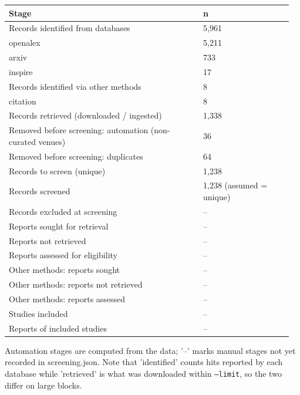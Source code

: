 \documentclass[10pt,a4paper]{article}
\begin{document}
{\scriptsize\begin{longtable}{p{0.655\linewidth}p{0.300\linewidth}}
\hline
\textbf{Stage} & \textbf{n} \\ \hline
\endhead
Records identified from databases & 5,961 \\
  openalex & 5,211 \\
  arxiv & 733 \\
  inspire & 17 \\
Records identified via other methods & 8 \\
  citation & 8 \\
Records retrieved (downloaded / ingested) & 1,338 \\
Removed before screening: automation (non-curated venues) & 36 \\
Removed before screening: duplicates & 64 \\
Records to screen (unique) & 1,238 \\
Records screened & 1,238 (assumed = unique) \\
Records excluded at screening & -- \\
Reports sought for retrieval & -- \\
Reports not retrieved & -- \\
Reports assessed for eligibility & -- \\
Other methods: reports sought & -- \\
Other methods: reports not retrieved & -- \\
Other methods: reports assessed & -- \\
Studies included & -- \\
Reports of included studies & -- \\
\hline
\end{longtable}}
Automation stages are computed from the data; '--' marks manual stages not yet recorded in screening.json. Note that 'identified' counts hits reported by each database while 'retrieved' is what was downloaded within \texttt{--limit}, so the two differ on large blocks.
\end{document}
